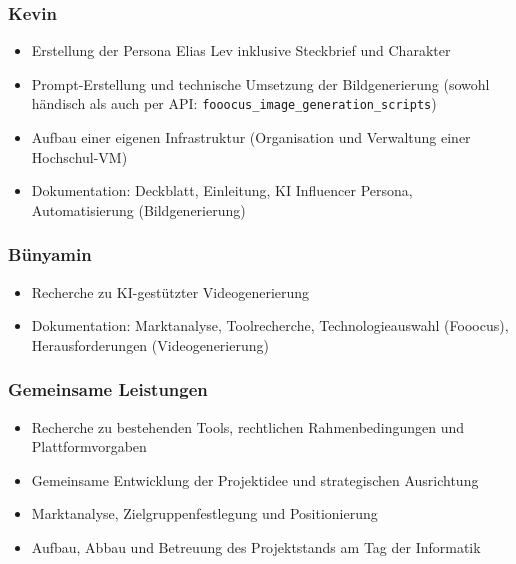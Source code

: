 \documentclass[a4paper,12pt]{article}
\begin{document}
\subsubsection*{Kevin}

\begin{itemize}
    \item Erstellung der Persona Elias Lev inklusive Steckbrief und Charakter
    \item Prompt-Erstellung und technische Umsetzung der Bildgenerierung (sowohl händisch als auch per API: \texttt{fooocus\_image\_generation\_scripts}) 
    \item Aufbau einer eigenen Infrastruktur (Organisation und Verwaltung einer Hochschul-VM)
    \item Dokumentation: Deckblatt, Einleitung, KI Influencer Persona, Automatisierung (Bildgenerierung)
\end{itemize}

\subsubsection*{Bünyamin}

\begin{itemize}
    \item Recherche zu KI-gestützter Videogenerierung
    \item Dokumentation: Marktanalyse, Toolrecherche, Technologieauswahl (Fooocus), Herausforderungen (Videogenerierung)
\end{itemize}

\subsubsection*{Gemeinsame Leistungen}

\begin{itemize}
    \item Recherche zu bestehenden Tools, rechtlichen Rahmenbedingungen und Plattformvorgaben
    \item Gemeinsame Entwicklung der Projektidee und strategischen Ausrichtung
    \item Marktanalyse, Zielgruppenfestlegung und Positionierung
    \item Aufbau, Abbau und Betreuung des Projektstands am Tag der Informatik
\end{itemize}
\end{document}

